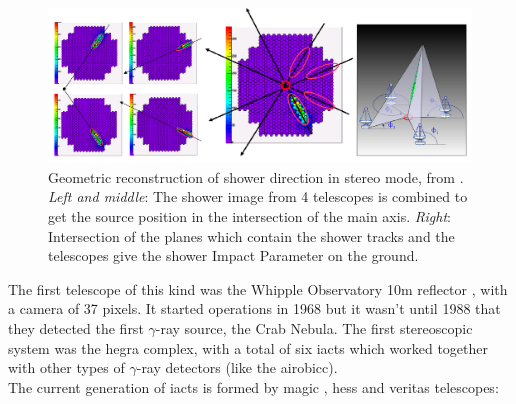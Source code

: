 \documentclass[main.tex]{subfiles}
\begin{document}
\begin{figure}
    \centering
    \includegraphics[width=1\textwidth]{Pictures/stereomode.pdf}
    \caption{Geometric reconstruction of shower direction in stereo mode, from \cite{2015groundbasedtechniques}. \textit{Left and middle}: The shower image from 4 telescopes is combined to get the source position in the intersection of the main axis. \textit{Right}: Intersection of the planes which contain the shower tracks and the telescopes give the shower Impact Parameter on the ground.}
    \label{fig:stereoreco}
\end{figure}

The first telescope of this kind was the Whipple Observatory 10m reflector \cite{whipple}, with a camera of 37 pixels. It started operations in 1968 but it wasn't until 1988 that they detected the first $\gamma$-ray source, the Crab Nebula. The first stereoscopic system was the \gls{hegra} complex, with a total of six \glspl{iact} which worked together with other types of $\gamma$-ray detectors (like the \gls{airobicc}).\\
The current generation of \glspl{iact} is formed by \gls{magic} \cite{2011magic}, \gls{hess} \cite{2018HESS} and \gls{veritas} \cite{2019VERITAS} telescopes:\\
\end{document}
